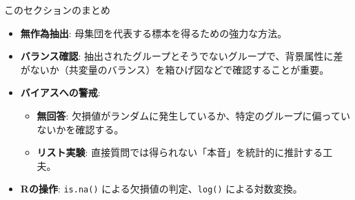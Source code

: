 \documentclass[
  ignorenonframetext,
]{beamer}
\providecommand{\tightlist}{%
  \setlength{\itemsep}{0pt}\setlength{\parskip}{0pt}}
\begin{document}
\begin{frame}[fragile]{このセクションのまとめ}
\protect\hypertarget{ux3053ux306eux30bbux30afux30b7ux30e7ux30f3ux306eux307eux3068ux3081}{}
\begin{itemize}
\tightlist
\item
  \textbf{無作為抽出}: 母集団を代表する標本を得るための強力な方法。
\item
  \textbf{バランス確認}:
  抽出されたグループとそうでないグループで、背景属性に差がないか（共変量のバランス）を箱ひげ図などで確認することが重要。
\item
  \textbf{バイアスへの警戒}:

  \begin{itemize}
  \tightlist
  \item
    \textbf{無回答}:
    欠損値がランダムに発生しているか、特定のグループに偏っていないかを確認する。
  \item
    \textbf{リスト実験}:
    直接質問では得られない「本音」を統計的に推計する工夫。
  \end{itemize}
\item
  \textbf{Rの操作}: \texttt{is.na()} による欠損値の判定、\texttt{log()}
  による対数変換。
\end{itemize}
\end{frame}
\end{document}
